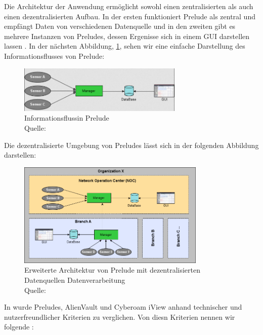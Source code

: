 Die Architektur der Anwendung ermöglicht sowohl einen zentralisierten als auch einen dezentralisierten Aufbau. In der ersten funktioniert Prelude als zentral und empfängt Daten von verschiedenen Datenquelle und in den zweiten gibt es mehrere Instanzen von Preludes, dessen Ergenisse sich in einem \gls{GUI} darstellen lassen \citep{Prelude_MU}. In der nächsten Abbildung, \ref{fig:Prelude}, sehen wir eine einfache Darstellung des Informationsflusses von Prelude:

\begin{figure}[H]
   \centering
   \includegraphics[width=0.7\textwidth]{assets/2_p4.png}
   \caption[Informationsfluss in Prelude]
   {Informationsflussin Prelude \\Quelle: \citep{Prelude_MU} }
   \label{fig:Prelude}
   \centering
\end{figure}

Die dezentralisierte Umgebung von Preludes lässt sich in der folgenden Abbildung darstellen:

\begin{figure}[H]
   \centering
   \includegraphics[width=0.8\textwidth]{assets/2_p5.png}
   \caption[Erweiterte Architektur von Prelude mit dezentralisierten Datenquellen und Datenverarbeitung]
   {Erweiterte Architektur von Prelude mit dezentralisierten Datenquellen Datenverarbeitung\\Quelle: \citep{Prelude_MU} }
   \centering
\end{figure}

In \citep{Grammatikis_Prelude} wurde Preludes, AlienVault und Cyberoam iView anhand technischer und nutzerfreundlicher Kriterien zu verglichen. Von diesn Kriterien nennen wir folgende \citep{Grammatikis_Prelude}: 

